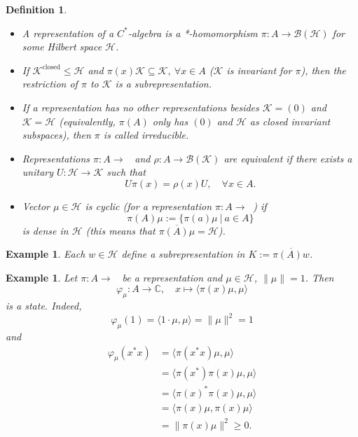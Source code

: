 \documentclass[10pt, a4paper]{article}
\newtheorem{defi}[thm]{Definition}
\newenvironment{noticeB}{%
  \tcolorbox[%
  notitle,
  empty,
  enhanced,  %
  breakable,
  coltext=black,
  colback=white, 
  fontupper=\rmfamily,
  noparskip,
  sharp corners,
  boxrule=-1pt,  %
  frame hidden,
  left=7pt,  %
  right=7pt,
  top=5pt,
  bottom=5pt,
  before skip=2.5ex plus 2pt,
  after skip=2.5ex plus 2pt,
  borderline west = {1.5pt}{-0.1pt}{blue!30!black}, %
  overlay unbroken and last={%
    \draw[color=black, line width=1.25pt]
    ($(frame.south west)+(1.pt, -0.1pt)$) -- ++(2em, 0);
  }
  ]}
{\endtcolorbox}
\newenvironment{definition}{\begin{noticeB}\begin{defi}}{%
    \end{defi}\end{noticeB}}
\newtheorem{example}[thm]{Example}
\newcommand{\C}{\mathbb {C}}
\DeclareMathOperator{\bh}{\mathcal{B} (\mathcal{H})}
\begin{document}
\begin{definition}
  \begin{itemize}
    \item A representation of a $C^*$-algebra is a *-homomorphism $\pi: A \to \mathcal{B}(\mathcal{H})$
  for some Hilbert space $\mathcal{H}$. 
    \item If $\mathcal{K}^{\mathrm{closed}} \leq \mathcal{H}$ and $\pi(x) \mathcal{K} \subseteq \mathcal{K},\ \forall x \in A$ ($\mathcal{K}$ is invariant for $\pi$),
  then the restriction of $\pi$ to $\mathcal{K}$ is a subrepresentation.
    \item   If a representation has no other representations besides $\mathcal{K} = (0)$ and $\mathcal{K} = \mathcal{H}$
  (equivalently, $\pi(A)$ only has $(0)$ and $\mathcal{H}$ as closed invariant subspaces),
  then $\pi$ is called irreducible.
    \item Representations $\pi: A \to \bh$ and $\rho: A \to \mathcal{B} (\mathcal{K})$
  are equivalent if there exists a unitary $U: \mathcal{H} \to \mathcal{K}$ such that $$U \pi(x) = \rho(x) U,\quad \forall x \in A.$$
    \item Vector $\mu \in \mathcal{H}$ is cyclic (for a representation $\pi: A \to \bh$) if 
    $$\pi (A) \mu := \{\pi(a) \mu\ |\ a \in A\}$$
    is dense in $\mathcal{H}$ (this means that $\overline{\pi (A) \mu} = \mathcal{H}$).
  \end{itemize}
   
\end{definition}

\begin{example}
  Each $w \in \mathcal{H}$ define a subrepresentation in $K := \overline{\pi (A) w}$.
\end{example}

\begin{example}
  Let $\pi: A \to \bh$ be a representation and $\mu \in \mathcal{H}$, $\| \mu \| = 1$.
  Then $$\varphi_\mu : A \to \C,\quad x \mapsto \langle \pi (x) \mu, \mu \rangle$$
  is a state. Indeed, 
  $$\varphi_\mu (1) = \langle 1 \cdot \mu, \mu \rangle = \| \mu \|^2 = 1$$
  and 
  \begin{align*}
    \varphi_\mu (x^* x) &= \langle \pi(x^* x) \mu, \mu \rangle\\
    &= \langle \pi (x^*) \pi (x) \mu, \mu \rangle\\
    &= \langle \pi (x)^* \pi (x) \mu, \mu\rangle \\
    &= \langle \pi (x) \mu, \pi(x) \mu \rangle\\
    &= \| \pi(x) \mu \|^2 \geq 0.
  \end{align*}
\end{example}
\end{document}
